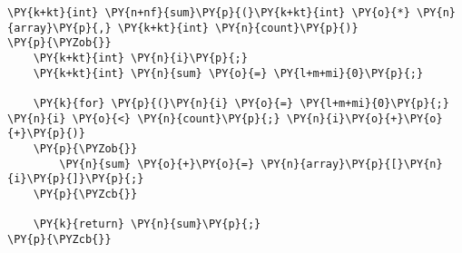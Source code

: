\begin{Verbatim}[commandchars=\\\{\}]
\PY{k+kt}{int} \PY{n+nf}{sum}\PY{p}{(}\PY{k+kt}{int} \PY{o}{*} \PY{n}{array}\PY{p}{,} \PY{k+kt}{int} \PY{n}{count}\PY{p}{)}
\PY{p}{\PYZob{}}
    \PY{k+kt}{int} \PY{n}{i}\PY{p}{;}
    \PY{k+kt}{int} \PY{n}{sum} \PY{o}{=} \PY{l+m+mi}{0}\PY{p}{;}

    \PY{k}{for} \PY{p}{(}\PY{n}{i} \PY{o}{=} \PY{l+m+mi}{0}\PY{p}{;} \PY{n}{i} \PY{o}{<} \PY{n}{count}\PY{p}{;} \PY{n}{i}\PY{o}{+}\PY{o}{+}\PY{p}{)}
    \PY{p}{\PYZob{}}
        \PY{n}{sum} \PY{o}{+}\PY{o}{=} \PY{n}{array}\PY{p}{[}\PY{n}{i}\PY{p}{]}\PY{p}{;}
    \PY{p}{\PYZcb{}}

    \PY{k}{return} \PY{n}{sum}\PY{p}{;}
\PY{p}{\PYZcb{}}
\end{Verbatim}

